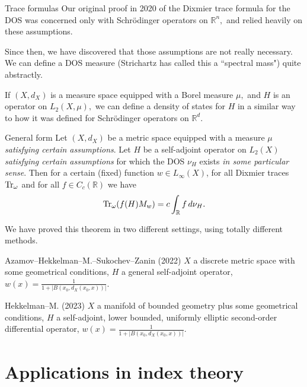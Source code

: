 \documentclass{beamer}
\numberwithin{equation}{section}
\theoremstyle{plain}
\theoremstyle{plain}
\theoremstyle{definition}
\theoremstyle{plain}
\theoremstyle{plain}
\theoremstyle{definition}
\newcommand{\tr}{{\rm Tr}}
\newcommand{\Rl}{\mathbb{R}}
\begin{document}
\begin{frame}{Trace formulas}
    Our original proof in 2020 of the Dixmier trace formula for the DOS was concerned only with Schr\"odinger operators on $\Rl^n,$ and relied heavily on these assumptions.\pause

    Since then, we have discovered that those assumptions are not really necessary. We can define a DOS measure (Strichartz has called this a ``spectral mass") quite abstractly.\pause
    
    If $(X,d_X)$ is a measure space equipped with a Borel measure $\mu,$ and $H$ is an operator on $L_2(X,\mu),$ we can define a density of states for $H$ in a similar way to how it was defined for Schr\"odinger operators on $\Rl^d.$
        
    
    \begin{block}{General form}
    Let $(X, d_X)$ be a metric space equipped with a measure $\mu$ \emph{satisfying certain assumptions}. Let $H$ be a self-adjoint operator on $L_2(X)$ \emph{satisfying certain assumptions} for which the DOS $\nu_H$ exists \emph{in some particular sense}. Then for a certain (fixed) function $w\in L_\infty(X)$, for all Dixmier traces $\tr_\omega$ and for all $f \in C_c(\mathbb{R})$ we have
\begin{equation*}\label{F: DOS integral}
    \tr_\omega(f(H)M_w) = c\int_{\mathbb{R}} f\,d\nu_H.
\end{equation*}
    \end{block}

\end{frame}

\begin{frame}
We have proved this theorem in two different settings, using totally different methods.

\begin{block}{Azamov--Hekkelman--M.--Sukochev--Zanin (2022)}
$X$ a discrete metric space with some geometrical conditions, $H$ a general self-adjoint operator, $w(x) = \frac{1}{1+|B(x_0, d_X(x_0, x))|}$.
\end{block}

\begin{block}{Hekkelman--M. (2023)}
$X$ a manifold of bounded geometry plus some geometrical conditions, $H$ a self-adjoint, lower bounded, uniformly elliptic second-order differential operator, $w(x) = \frac{1}{1+|B(x_0, d_X(x_0, x))|}$.
\end{block}
\end{frame}

\section{Applications in index theory}
\end{document}

